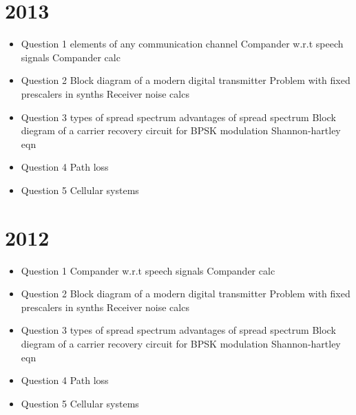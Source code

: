 \documentclass{article}
\begin{document}
\begin{multicols}{2}
\begin{itemize}
\end{itemize}
\section{2013}
\begin{itemize}
	\item Question 1
		 elements of any communication channel
		\subitem Compander w.r.t speech signals
		\subitem Compander calc
	\item Question 2
		\subitem Block diagram of a modern digital transmitter
		\subitem Problem with fixed prescalers in synths
		\subitem Receiver noise calcs
	\item Question 3
		 types of spread spectrum
		 advantages of spread spectrum
		\subitem Block diegram of a carrier recovery circuit for BPSK modulation
		\subitem Shannon-hartley eqn
	\item Question 4
		\subitem Path loss
	\item Question 5
		\subitem Cellular systems
	
\end{itemize}
\section{2012}
\begin{itemize}
	\item Question 1
		\subitem 
		\subitem Compander w.r.t speech signals
		\subitem Compander calc
	\item Question 2
		\subitem Block diagram of a modern digital transmitter
		\subitem Problem with fixed prescalers in synths
		\subitem Receiver noise calcs
	\item Question 3
		 types of spread spectrum
		 advantages of spread spectrum
		\subitem Block diegram of a carrier recovery circuit for BPSK modulation
		\subitem Shannon-hartley eqn
	\item Question 4
		\subitem Path loss
	\item Question 5
		\subitem Cellular systems
	
\end{itemize}

\end{multicols}
\end{document}
